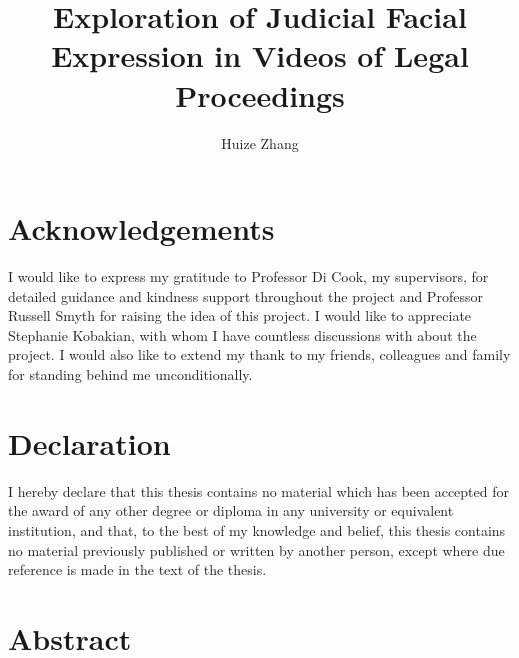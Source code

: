 \documentclass{monashthesis}
\author{Huize Zhang}
\title{Exploration of Judicial Facial Expression in Videos of Legal Proceedings}
\begin{document}

\titlepage

{\sf\tighttoc\doublespacing}

\clearpage{}\setcounter{page}{0}

\hypertarget{acknowledgements}{%
\chapter*{Acknowledgements}\label{acknowledgements}}

I would like to express my gratitude to Professor Di Cook, my supervisors, for detailed guidance and kindness support throughout the project and Professor Russell Smyth for raising the idea of this project. I would like to appreciate Stephanie Kobakian, with whom I have countless discussions with about the project. I would also like to extend my thank to my friends, colleagues and family for standing behind me unconditionally.

\let\cleardoublepage\clearpage

\hypertarget{declaration}{%
\chapter*{Declaration}\label{declaration}}

I hereby declare that this thesis contains no material which has been accepted for the award of any other degree or diploma in any university or equivalent institution, and that, to the best of my knowledge and belief, this thesis contains no material previously published or written by another person, except where due reference is made in the text of the thesis.

\vspace*{2cm}\par\authorname
\let\cleardoublepage\clearpage

\hypertarget{abstract}{%
\chapter*{Abstract}\label{abstract}}
\end{document}
